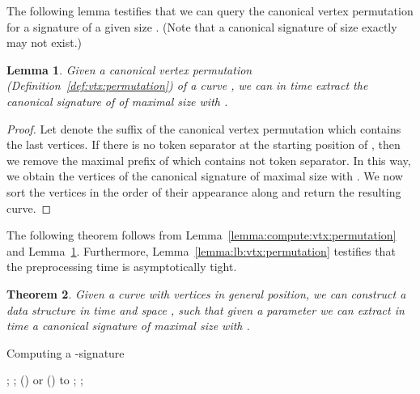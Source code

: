 \documentclass[11pt, letter]{article}
\newtheorem{theorem}{Theorem}[section]
\newtheorem{lemma}[theorem]{Lemma}
\newcommand{\thmlab}[1]{{\label{theo:#1}}}
\newcommand{\lemlab}[1]{\label{lemma:#1}}
\newcommand{\lemref}[1]{Lemma~\ref{lemma:#1}}
\newcommand{\defref}[1]{Definition~\ref{def:#1}}
\newcommand{\alglab}[1]{\label{alg:#1}}
\begin{document}
The following lemma testifies that we can query the canonical vertex permutation for a signature of a given size . (Note that a canonical signature of size
exactly  may not exist.)

\begin{lemma}\lemlab{extract:signature}
Given a canonical vertex permutation (\defref{vtx:permutation}) of a curve , we can in  time extract the canonical signature of  of maximal size  with .
\end{lemma}
\begin{proof}
Let  denote the suffix of the canonical vertex permutation which contains the last  vertices. If there is no token separator at the starting position of , then we remove the maximal prefix of  which contains not token separator. In this way, we obtain the vertices of the canonical signature  of maximal size  with . We now sort the vertices in the order of their appearance along  and return the resulting curve.
\end{proof}

The following theorem follows from \lemref{compute:vtx:permutation} and \lemref{extract:signature}. Furthermore, \lemref{lb:vtx:permutation} testifies that the preprocessing time is asymptotically tight.

\begin{theorem}\thmlab{compute:signatures}
Given a curve  with  vertices in general position, we can construct a data structure in time  and space , such that given a parameter  we can extract in time  a canonical signature of maximal size  with .
\end{theorem}

\begin{algorithm}[]\alglab{low:pass} 
 \caption{Computing a -signature}
       ; ;  
       \lRepeat(){  or  }{\;}
       \For(){ to }{
       }
       \If{}{
       ; ;  
       }
       ; ;  
\end{algorithm}
\end{document}
